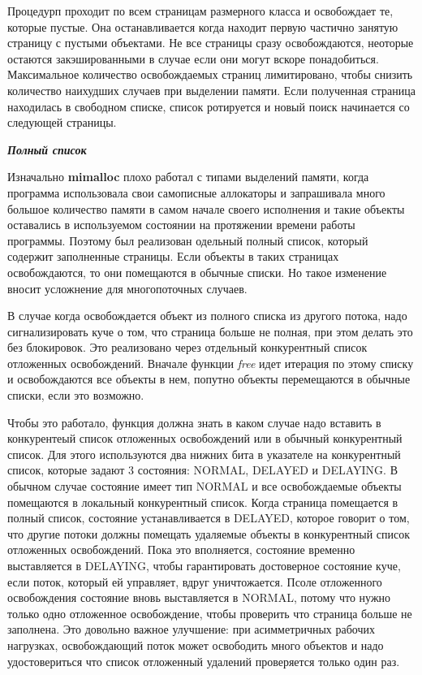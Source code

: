 Процедурп проходит по всем страницам размерного класса и освобождает те, которые пустые. Она останавливается когда находит первую частично занятую страницу с пустыми объектами. Не все страницы сразу освобождаются, неоторые остаются закэшированными в случае если они могут вскоре понадобиться. Максимальное количество освобождаемых страниц лимитировано, чтобы снизить количество наихудших случаев при выделении памяти. Если полученная страница находилась в свободном списке, список ротируется и новый поиск начинается со следующей страницы.

\bigbreak
\textbf{\textit{Полный список}}

Изначально \textbf{mimalloc} плохо работал с типами выделений памяти, когда программа использовала свои самописные аллокаторы и запрашивала много большое количество памяти в самом начале своего исполнения и такие объекты оставались в используемом состоянии на протяжении времени работы программы. Поэтому был реализован одельный полный список, который содержит заполненные страницы. Если объекты в таких страницах освобождаются, то они помещаются в обычные списки. Но такое изменение вносит усложнение для многопоточных случаев.

В случае когда освобождается объект из полного списка из другого потока, надо сигнализировать куче о том, что страница больше не полная, при этом делать это без блокировок. Это реализовано через отдельный конкурентный список отложенных освобождений. Вначале функции \textit{free} идет итерация по этому списку и освобождаются все объекты в нем, попутно объекты перемещаются в обычные списки, если это возможно.

Чтобы это работало, функция должна знать в каком случае надо вставить в конкурентеый список отложенных освобождений или в обычный конкурентный список. Для этого используются два нижних бита в указателе на конкурентный список, которые задают 3 состояния: NORMAL, DELAYED и DELAYING. В обычном случае состояние имеет тип NORMAL и все освобождаемые объекты помещаются в локальный конкурентный список. Когда страница помещается в полный список, состояние устанавливается в DELAYED, которое говорит о том, что другие потоки должны помещать удаляемые объекты в конкурентный список отложенных освобождений. Пока это вполняется, состояние временно выставляется в DELAYING, чтобы гарантировать достоверное состояние куче, если поток, который ей управляет, вдруг уничтожается. Псоле отложенного освобождения состояние вновь выставляется в NORMAL, потому что нужно только одно отложенное освобождение, чтобы проверить что страница больше не заполнена. Это довольно важное улучшение: при асимметричных рабочих нагрузках, освобождающий поток может освободить много объектов и надо удостовериться что список отложенный удалений проверяется только один раз.

